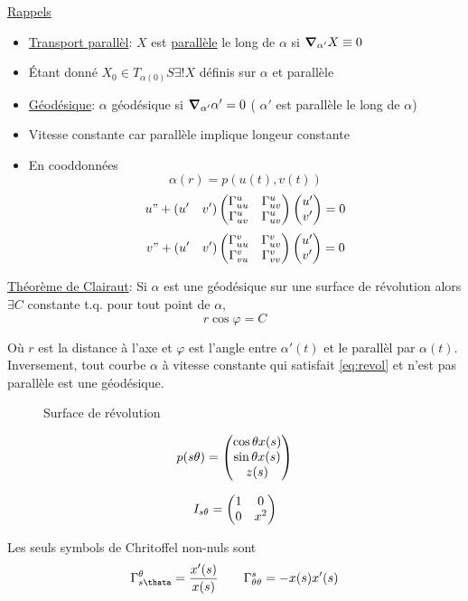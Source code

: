 



\underline{Rappels} 

\begin{itemize}
	\item \underline{Transport parallèl}: $X$ est \underline{parallèle} le long de $\alpha$ si $\grad_{\alpha'} X \equiv 0$    
	\item Étant donné $X_{0} \in T_{\alpha(0)} S \exists! X$ définis sur $\alpha$ et parallèle  
	\item \underline{Géodésique}: $\alpha$ géodésique si $\grad_{\alpha'} \alpha' = 0$ ( $\alpha'$ est parallèle le long de $\alpha$)    
	\item Vitesse constante car parallèle implique longeur constante
	\item En cooddonnées $$\alpha(r) = p(u(t), v(t))$$  $$u" + (u' \quad v') \begin{pmatrix} \Gamma_{uu}^u & \Gamma_{uv}^u \\ \Gamma_{uv}^u &\Gamma_{uv}^u \end{pmatrix}\begin{pmatrix} u' \\ v' \end{pmatrix} = 0$$ $$v" + (u' \quad v') \begin{pmatrix} \Gamma_{uu}^v & \Gamma_{uv}^v \\ \Gamma_{vu}^v & \Gamma_{vv}^v \end{pmatrix}\begin{pmatrix} u'\\v' \end{pmatrix} =0$$  
\end{itemize}

\underline{Théorème de Clairaut}: Si $\alpha$ est une géodésique sur une surface de révolution alors $\exists C$ constante t.q. pour tout point de $\alpha$, \begin{equation}
	r\cos \varphi = C \tag{**} \label{eq:revol}
\end{equation}   

Où $r$ est la distance à l'axe et $\varphi$ est l'angle entre $\alpha'(t)$ et le parallèl par $\alpha(t)$. Inversement, tout courbe $\alpha$ à vitesse constante qui satisfait \eqref{eq:revol} et n'est pas parallèle est une géodésique.

\begin{figure}[ht]
    \centering
    \caption{Surface de révolution}
    \label{fig:surface-de-révolution}
\end{figure}

$$p(s\theta) = \begin{pmatrix} \cos\theta x(s) \\ \sin\theta x(s) \\ z(s) \end{pmatrix}$$ 

$$I_{s\theta} = \begin{pmatrix} 1 &0 \\ 0 & x^2 \end{pmatrix}$$ 

Les seuls symbols de Chritoffel non-nuls sont $$\Gamma_{s\thata}^\theta = \frac{x'(s)}{x(s)} \qquad \Gamma_{\theta\theta}^s = - x(s) x'(s)$$ 

